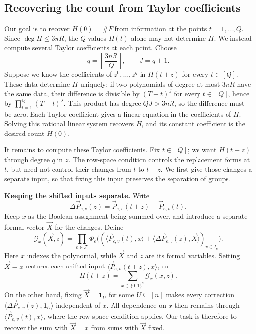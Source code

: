 \subsection{Recovering the count from Taylor coefficients}
\label{subsec:preview-interpolation}
Our goal is to recover $H(0)=\#F$ from information at the points
$t=1,\ldots,Q$. Since $\deg H\le3nR$, the $Q$ values $H(t)$ alone
may not determine $H$. We instead compute several Taylor
coefficients at each point. Choose
\[
 q=\left\lfloor\frac{3nR}{Q}\right\rfloor,\qquad J=q+1.
\]
Suppose we know the coefficients of $z^0,\ldots,z^q$ in $H(t+z)$
for every $t\in[Q]$. These data determine $H$ uniquely: if two
polynomials of degree at most $3nR$ have the same data, their
difference is divisible by $(T-t)^J$ for every $t\in[Q]$, hence by
$\prod_{t=1}^Q(T-t)^J$. This product has degree $QJ>3nR$, so the
difference must be zero. Each Taylor coefficient gives a linear
equation in the coefficients of $H$. Solving this rational linear
system recovers $H$, and its constant coefficient is the desired
count $H(0)$.

It remains to compute these Taylor coefficients. Fix $t\in[Q]$;
we want $H(t+z)$ through degree $q$ in $z$. The row-space condition controls
the replacement forms at $t$, but need not control their changes
from $t$ to $t+z$. We first give those changes a separate input,
so that fixing this input preserves the separation of groups.

\smallskip\noindent
\textbf{Keeping the shifted inputs separate.}
Write
\[
 \Delta\vec P_{e,v}(z)=\vec P_{e,v}(t+z)-\vec P_{e,v}(t).
\]
Keep $x$ as the Boolean assignment being summed over, and introduce
a separate formal vector $\vec X$ for the changes. Define
\begin{equation}\label{eq:outline-taylor-product}
 \mathcal G_x(\vec X,z)=
 \prod_{e\in\mathcal F}\Phi_e\bigl(
       (\langle\vec P_{e,v}(t),x\rangle+
        \langle\Delta\vec P_{e,v}(z),\vec X\rangle)_{v\in I_e}\bigr).
\end{equation}
Here $x$ indexes the polynomial, while $\vec X$ and $z$ are its
formal variables. Setting $\vec X=x$ restores each shifted input
$\langle\vec P_{e,v}(t+z),x\rangle$, so
\[
 H(t+z)=\sum_{x\in\{0,1\}^n}\mathcal G_x(x,z).
\]
On the other hand, fixing $\vec X=\mathbf1_U$ for some
$U\subseteq[n]$ makes every correction
$\langle\Delta\vec P_{e,v}(z),\mathbf1_U\rangle$ independent of $x$.
All dependence on $x$ then remains through
$\langle\vec P_{e,v}(t),x\rangle$, where the row-space condition applies.
Our task is therefore to recover the sum with $\vec X=x$
from sums with $\vec X$ fixed.

